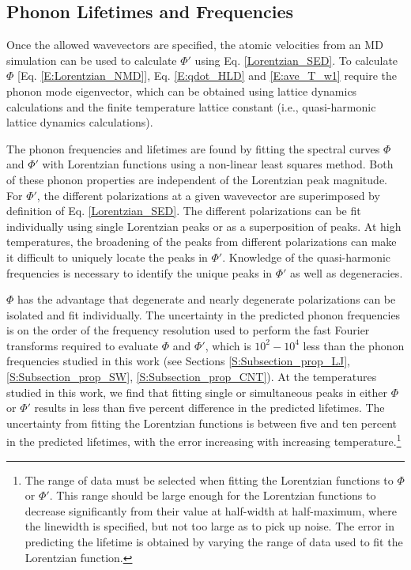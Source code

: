 \documentclass[aps,prb,preprint,superscriptaddress,amsmath,amssymb,floatfix]{revtex4}
\begin{document}
\subsection{\label{Subsection_Comp_Details_2}Phonon Lifetimes and Frequencies}

Once the allowed wavevectors are specified, the atomic velocities from an MD simulation can be used to calculate $\Phi'$ using Eq$.$ \eqref{Lorentzian_SED}. To calculate $\Phi$ [Eq$.$ \eqref{E:Lorentzian_NMD}], Eq$.$ \eqref{E:qdot_HLD} and \eqref{E:ave_T_w1} require the phonon mode eigenvector, which can be obtained using lattice dynamics calculations and the finite temperature lattice constant (i.e., quasi-harmonic lattice dynamics calculations).\cite{dove1993}

The phonon frequencies and lifetimes are found by fitting the spectral curves $\Phi$ and $\Phi'$ with Lorentzian functions using a non-linear least squares method. Both of these phonon properties are independent of the Lorentzian peak magnitude. For $\Phi'$, the different polarizations at a given wavevector are superimposed by definition of Eq$.$ \eqref{Lorentzian_SED}. The different polarizations can be fit individually using single Lorentzian peaks or as a superposition of peaks. At high temperatures, the broadening of the peaks from different polarizations can make it difficult to uniquely locate the peaks in $\Phi'$. Knowledge of the quasi-harmonic frequencies is necessary to identify the unique peaks in $\Phi'$ as well as degeneracies.\cite{mcgaughey2006b,turney2009a}

$\Phi$ has the advantage that degenerate and nearly degenerate polarizations can be isolated and fit individually. The uncertainty in the predicted phonon frequencies is on the order of the frequency resolution used to perform the fast Fourier transforms required to evaluate $\Phi$ and $\Phi'$, which is $10^2-10^4$ less than the phonon frequencies studied in this work (see Sections \ref{S:Subsection_prop_LJ}, \ref{S:Subsection_prop_SW}, \ref{S:Subsection_prop_CNT}). At the temperatures studied in this work, we find that fitting single or simultaneous peaks in either $\Phi$ or $\Phi'$ results in less than five percent difference in the predicted lifetimes. The uncertainty from fitting the Lorentzian functions is between five and ten percent in the predicted lifetimes, with the error increasing with increasing temperature.\footnote[1]{The range of data must be selected when fitting the Lorentzian functions to $\Phi$ or $\Phi'$. This range should be large enough for the Lorentzian functions to decrease significantly from their value at
half-width at half-maximum, where the linewidth is specified, but not too large as to pick up noise. The error in predicting the lifetime is obtained by varying the range of data
used to fit the Lorentzian function.}
\end{document}
